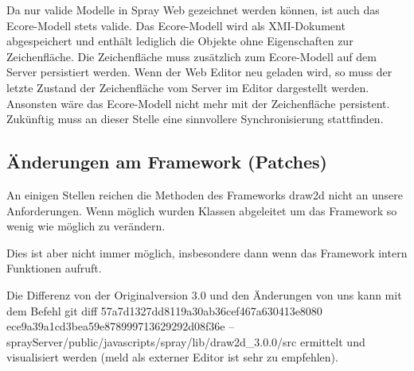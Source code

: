Da nur valide Modelle in Spray Web gezeichnet werden können, ist auch das Ecore-Modell stets valide.
Das Ecore-Modell wird als XMI-Dokument abgespeichert und enthält lediglich die Objekte ohne
Eigenschaften zur Zeichenfläche. Die Zeichenfläche muss zusätzlich zum Ecore-Modell auf dem Server persistiert werden.
Wenn der Web Editor neu geladen wird, so muss der letzte Zustand der Zeichenfläche vom Server im Editor dargestellt
werden. Ansonsten wäre das Ecore-Modell nicht mehr mit der Zeichenfläche persistent. Zukünftig muss an dieser Stelle
eine sinnvollere Synchronisierung stattfinden.

\subsection{Änderungen am Framework (Patches)}

An einigen Stellen reichen die Methoden des Frameworks draw2d nicht an unsere Anforderungen.
Wenn möglich wurden Klassen abgeleitet um das Framework so wenig wie möglich zu verändern.

Dies ist aber nicht immer möglich, insbesondere dann wenn das Framework intern Funktionen aufruft.

Die Differenz von der Originalversion 3.0 und den Änderungen von uns kann mit dem Befehl 
git diff 57a7d1327dd8119a30ab36cef467a630413e8080 ece9a39a1cd3bea59e878999713629292d08f36e -- sprayServer/public/javascripts/spray/lib/draw2d_3.0.0/src
ermittelt und visualisiert werden (meld als externer Editor ist sehr zu empfehlen).
